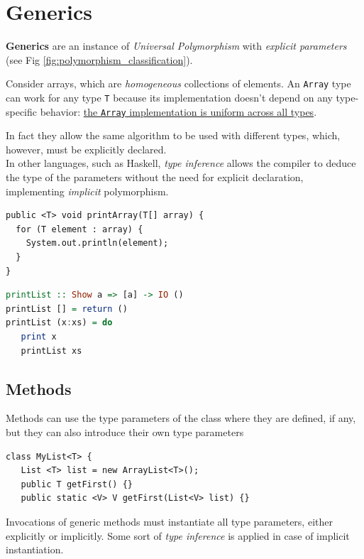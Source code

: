 \chapter{Generics}
\textbf{Generics} are an instance of \textit{Universal Polymorphism} with \textit{explicit parameters} (see Fig \ref{fig:polymorphism_classification}).

Consider arrays, which are \textit{homogeneous} collections of elements. An \lstinline|Array| type can work for any type \lstinline|T| because its implementation doesn't depend on any type-specific behavior: \ul{the \texttt{Array} implementation is uniform across all types}.

In fact they allow the same algorithm to be used with different types, which, however, must be explicitly declared.\\
In other languages, such as Haskell, \textit{type inference} allows the compiler to deduce the type of the parameters without the need for explicit declaration, implementing \textit{implicit} polymorphism.
\begin{paracol}{2}
   \begin{lstlisting}[caption={Java's explicit universal polymorphism}]
public <T> void printArray(T[] array) {
  for (T element : array) {
    System.out.println(element);
  }
}    
   \end{lstlisting}
 
   \switchcolumn

   \begin{lstlisting}[language=Haskell,caption={Haskell's implicit universal polymorphism}]
printList :: Show a => [a] -> IO ()
printList [] = return ()
printList (x:xs) = do
   print x
   printList xs         
   \end{lstlisting}
\end{paracol}

\section{Methods}
Methods can use the type parameters of the class
where they are defined, if any, but they can also introduce their own type parameters
\begin{lstlisting}
class MyList<T> {
   List <T> list = new ArrayList<T>();
   public T getFirst() {}
   public static <V> V getFirst(List<V> list) {}
\end{lstlisting}
Invocations of generic methods must instantiate all
type parameters, either explicitly or implicitly.
Some sort of \textit{type inference} is applied in case of implicit instantiation.

